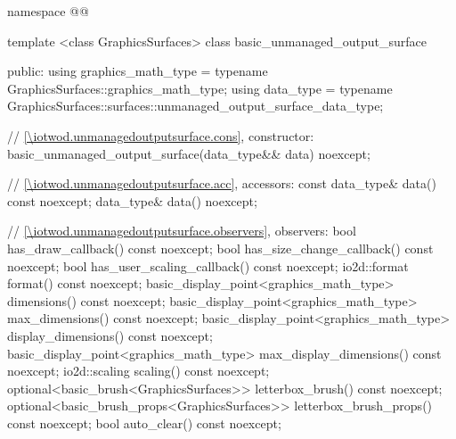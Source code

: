 \begin{codeblock}
namespace @\fullnamespace{}@ {
  template <class GraphicsSurfaces>
  class basic_unmanaged_output_surface {
  public:
    using graphics_math_type = typename GraphicsSurfaces::graphics_math_type;
    using data_type = 
      typename GraphicsSurfaces::surfaces::unmanaged_output_surface_data_type;

    // \ref{\iotwod.unmanagedoutputsurface.cons}, constructor:
    basic_unmanaged_output_surface(data_type&& data) noexcept;
	
	// \ref{\iotwod.unmanagedoutputsurface.acc}, accessors:
    const data_type& data() const noexcept;
    data_type& data() noexcept;

    // \ref{\iotwod.unmanagedoutputsurface.observers}, observers:
    bool has_draw_callback() const noexcept;
    bool has_size_change_callback() const noexcept;
    bool has_user_scaling_callback() const noexcept;
    io2d::format format() const noexcept;
    basic_display_point<graphics_math_type> dimensions() const noexcept;
    basic_display_point<graphics_math_type> max_dimensions() const noexcept;
    basic_display_point<graphics_math_type> display_dimensions() const noexcept;
    basic_display_point<graphics_math_type> max_display_dimensions() const 
      noexcept;
    io2d::scaling scaling() const noexcept;
    optional<basic_brush<GraphicsSurfaces>> letterbox_brush() const noexcept;
    optional<basic_brush_props<GraphicsSurfaces>> letterbox_brush_props() const 
      noexcept;
    bool auto_clear() const noexcept;

}}
\end{codeblock}
